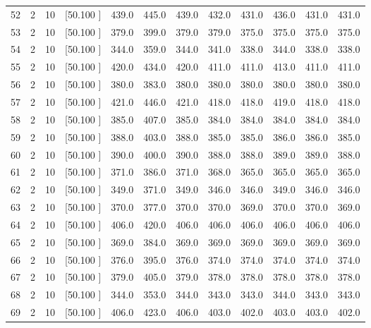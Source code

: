 \documentclass[12pt,a4paper]{article}
\begin{document}
\begin{center}
{\begin{tabular}{r r r r r r r r r r r r}
  52&  2& 10&[50.100    ]&   439.0&   445.0&   439.0&   432.0&   431.0&   436.0&   431.0&   431.0\\[-0.02in]
  53&  2& 10&[50.100    ]&   379.0&   399.0&   379.0&   379.0&   375.0&   375.0&   375.0&   375.0\\[-0.02in]
  54&  2& 10&[50.100    ]&   344.0&   359.0&   344.0&   341.0&   338.0&   344.0&   338.0&   338.0\\[-0.02in]
  55&  2& 10&[50.100    ]&   420.0&   434.0&   420.0&   411.0&   411.0&   413.0&   411.0&   411.0\\[-0.02in]
  56&  2& 10&[50.100    ]&   380.0&   383.0&   380.0&   380.0&   380.0&   380.0&   380.0&   380.0\\[-0.02in]
  57&  2& 10&[50.100    ]&   421.0&   446.0&   421.0&   418.0&   418.0&   419.0&   418.0&   418.0\\[-0.02in]
  58&  2& 10&[50.100    ]&   385.0&   407.0&   385.0&   384.0&   384.0&   384.0&   384.0&   384.0\\[-0.02in]
  59&  2& 10&[50.100    ]&   388.0&   403.0&   388.0&   385.0&   385.0&   386.0&   386.0&   385.0\\[-0.02in]
  60&  2& 10&[50.100    ]&   390.0&   400.0&   390.0&   388.0&   388.0&   389.0&   389.0&   388.0\\[-0.02in]
  61&  2& 10&[50.100    ]&   371.0&   386.0&   371.0&   368.0&   365.0&   365.0&   365.0&   365.0\\[-0.02in]
  62&  2& 10&[50.100    ]&   349.0&   371.0&   349.0&   346.0&   346.0&   349.0&   346.0&   346.0\\[-0.02in]
  63&  2& 10&[50.100    ]&   370.0&   377.0&   370.0&   370.0&   369.0&   370.0&   370.0&   369.0\\[-0.02in]
  64&  2& 10&[50.100    ]&   406.0&   420.0&   406.0&   406.0&   406.0&   406.0&   406.0&   406.0\\[-0.02in]
  65&  2& 10&[50.100    ]&   369.0&   384.0&   369.0&   369.0&   369.0&   369.0&   369.0&   369.0\\[-0.02in]
  66&  2& 10&[50.100    ]&   376.0&   395.0&   376.0&   374.0&   374.0&   374.0&   374.0&   374.0\\[-0.02in]
  67&  2& 10&[50.100    ]&   379.0&   405.0&   379.0&   378.0&   378.0&   378.0&   378.0&   378.0\\[-0.02in]
  68&  2& 10&[50.100    ]&   344.0&   353.0&   344.0&   343.0&   343.0&   344.0&   343.0&   343.0\\[-0.02in]
  69&  2& 10&[50.100    ]&   406.0&   423.0&   406.0&   403.0&   402.0&   403.0&   403.0&   402.0\\[-0.02in]

\end{tabular}}
\end{center}
\end{document}
